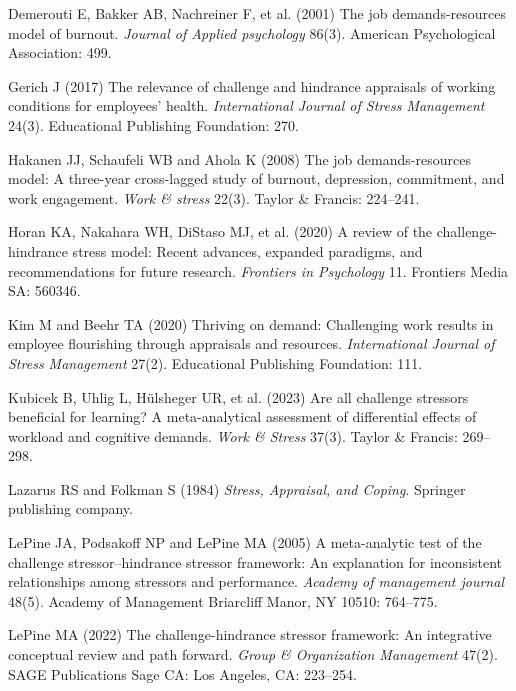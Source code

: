 \documentclass[
  man]{apa7}
\newlength{\cslhangindent}
\newlength{\cslentryspacingunit} %
\newenvironment{CSLReferences}[2] %
 {%
  \setlength{\parindent}{0pt}
  \ifodd #1
  \let\oldpar\par
  \def\par{\hangindent=\cslhangindent\oldpar}
  \fi
  \setlength{\parskip}{#2\cslentryspacingunit}
 }%
 {}
\begin{document}
\begin{CSLReferences}{1}{0}
\leavevmode{}%
Demerouti E, Bakker AB, Nachreiner F, et al. (2001) The job demands-resources model of burnout. \emph{Journal of Applied psychology} 86(3). American Psychological Association: 499.

\leavevmode{}%
Gerich J (2017) The relevance of challenge and hindrance appraisals of working conditions for employees' health. \emph{International Journal of Stress Management} 24(3). Educational Publishing Foundation: 270.

\leavevmode{}%
Hakanen JJ, Schaufeli WB and Ahola K (2008) The job demands-resources model: A three-year cross-lagged study of burnout, depression, commitment, and work engagement. \emph{Work \& stress} 22(3). Taylor \& Francis: 224--241.

\leavevmode{}%
Horan KA, Nakahara WH, DiStaso MJ, et al. (2020) A review of the challenge-hindrance stress model: Recent advances, expanded paradigms, and recommendations for future research. \emph{Frontiers in Psychology} 11. Frontiers Media SA: 560346.

\leavevmode{}%
Kim M and Beehr TA (2020) Thriving on demand: Challenging work results in employee flourishing through appraisals and resources. \emph{International Journal of Stress Management} 27(2). Educational Publishing Foundation: 111.

\leavevmode{}%
Kubicek B, Uhlig L, Hülsheger UR, et al. (2023) Are all challenge stressors beneficial for learning? A meta-analytical assessment of differential effects of workload and cognitive demands. \emph{Work \& Stress} 37(3). Taylor \& Francis: 269--298.

\leavevmode{}%
Lazarus RS and Folkman S (1984) \emph{Stress, Appraisal, and Coping}. Springer publishing company.

\leavevmode{}%
LePine JA, Podsakoff NP and LePine MA (2005) A meta-analytic test of the challenge stressor--hindrance stressor framework: An explanation for inconsistent relationships among stressors and performance. \emph{Academy of management journal} 48(5). Academy of Management Briarcliff Manor, NY 10510: 764--775.

\leavevmode{}%
LePine MA (2022) The challenge-hindrance stressor framework: An integrative conceptual review and path forward. \emph{Group \& Organization Management} 47(2). SAGE Publications Sage CA: Los Angeles, CA: 223--254.


\end{CSLReferences}
\end{document}
